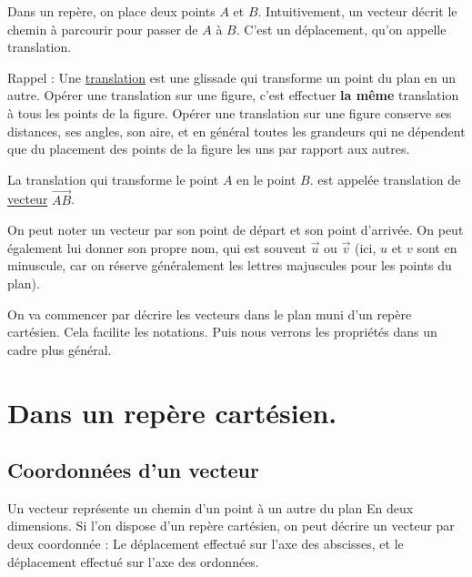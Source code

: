 \documentclass[10pt,a4paper,oneside]{book}
\begin{document}
Dans un repère, on place deux points $A$ et $B$. Intuitivement, un vecteur décrit le chemin à parcourir pour passer de $A$ à $B$. C'est un déplacement, qu'on appelle translation.

\begin{de}[Translation]
  Rappel : Une \underline{translation} est une glissade qui transforme un point du plan en un autre. Opérer une translation sur une figure, c'est effectuer \textbf{la même} translation à tous les points de la figure.
  Opérer une translation sur une figure conserve ses distances, ses angles, son aire, et en général toutes les grandeurs qui ne dépendent que du placement des points de la figure les uns par rapport aux autres. 
\end{de}

\begin{de}[Vecteur]
La translation qui transforme le point $A$ en le point $B$. est appelée translation de \underline{vecteur} $\overrightarrow{AB}$.
\end{de}

On peut noter un vecteur par son point de départ et son point d'arrivée. On peut également lui donner son propre nom, qui est souvent $\overrightarrow{u}$ ou $\overrightarrow{v}$ (ici, $u$ et $v$ sont en minuscule, car on réserve généralement les lettres majuscules  pour les points du plan).

\begin{center}
\end{center}

On va commencer par décrire les vecteurs dans le plan muni d'un repère cartésien. Cela facilite les notations. Puis nous verrons les propriétés dans un cadre plus général.

\section{Dans un repère cartésien.}

\subsection{Coordonnées d'un vecteur}

Un vecteur représente un chemin d'un point à un autre du plan En deux dimensions. Si l'on dispose d'un repère cartésien, on peut décrire un vecteur par deux coordonnée : Le déplacement effectué sur l'axe des abscisses, et le déplacement effectué sur l'axe des ordonnées.
\end{document}
